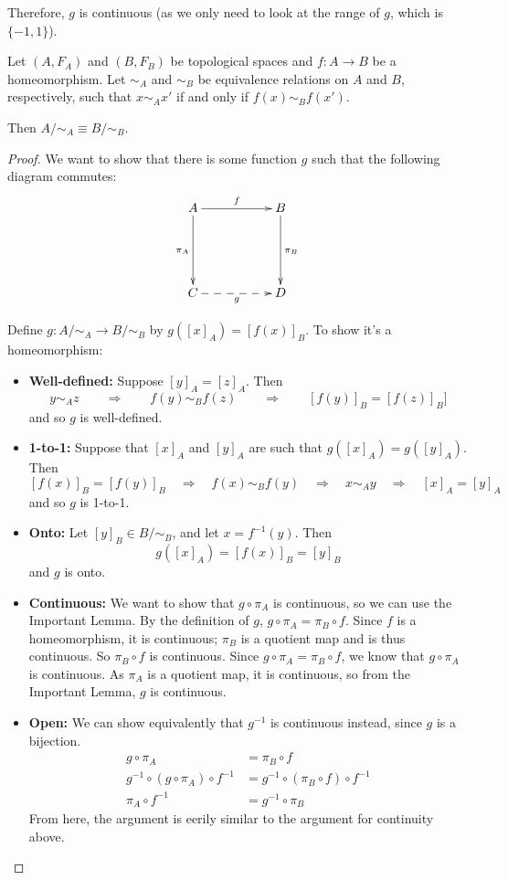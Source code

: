 Therefore, $g$ is continuous (as we only need to look at the range of $g$, which is $\{-1, 1\}$). 
\begin{theorem}
	Let $(A, F_A)$ and $(B, F_B)$ be topological spaces and $f:A\to B$ be a homeomorphism. Let $\sim_A$ and $\sim_B$ be equivalence relations on $A$ and $B$, respectively, such that $x\sim_A x'$ if and only if $f(x) \sim_B f(x')$.
	
	Then $A/\!\sim_A \equiv B/\!\sim_B$. 
\end{theorem}
\begin{proof}
	We want to show that there is some function $g$ such that the following diagram commutes:
	\[ \xymatrix{ A \ar[rr]^f \ar[dd]_{\pi_A} && B \ar[dd]^{\pi_B} \\
	&&\\C \ar @{-->}[rr]_g & & D } \]
	
	\item Define $g:A/\!\sim_A \to B/\!\sim_B$ by $g\left([x]_A\right) = \left[ f(x) \right]_B$. To show it's a homeomorphism: 
	\begin{itemize}
		\item \textbf{Well-defined:} Suppose $[y]_A = [z]_A$. Then
		\[y\sim_A z\qquad\Rightarrow\qquad f(y) \sim_B f(z) \qquad\Rightarrow \qquad[f(y)]_B = [f(z)]_B]\]
		and so $g$ is well-defined. 
		\item \textbf{1-to-1:} Suppose that $[x]_A$ and $[y]_A$ are such that $g([x]_A) = g([y]_A)$. Then
		\[ [f(x)]_B = [f(y)]_B\quad\Rightarrow\quad f(x)\sim_B f(y)\quad\Rightarrow\quad x\sim_A y \quad\Rightarrow\quad [x]_A = [y]_A\]
		and so $g$ is 1-to-1. 
		\item \textbf{Onto: } Let $[y]_B\in B/\!\sim_B$, and let $x = f^{-1}(y)$. Then
		\[ g([x]_A) = [f(x)]_B = [y]_B \]
		and $g$ is onto. 
		\item \textbf{Continuous: } We want to show that $g\circ \pi_A$ is continuous, so we can use the Important Lemma. By the definition of $g$, $g\circ \pi_A = \pi_B\circ f$. Since $f$ is a homeomorphism, it is continuous; $\pi_B$ is a quotient map and is thus continuous. So $\pi_B\circ f$ is continuous. Since $g\circ \pi_A = \pi_B\circ f$, we know that $g\circ \pi_A$ is continuous. As $\pi_A$ is a quotient map, it is continuous, so from the Important Lemma, $g$ is continuous. 
		\item \textbf{Open: } We can show equivalently that $g^{-1}$ is continuous instead, since $g$ is a bijection. 
		\begin{align*}
			g\circ\pi_A &= \pi_B\circ f \\
			g^{-1}\circ(g\circ\pi_A)\circ f^{-1} &= g^{-1}\circ(\pi_B\circ f)\circ f^{-1} \\
			\pi_A\circ f^{-1} & =g^{-1}\circ \pi_B 
		\end{align*}
		From here, the argument is eerily similar to the argument for continuity above.
		

\end{itemize}
\end{proof}
